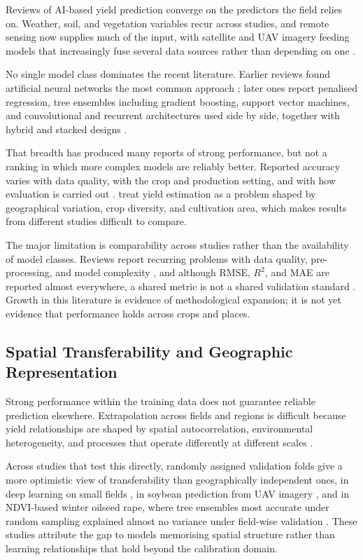 \documentclass[ASNA,twocolumn]{USG}
\begin{document}
Reviews of AI-based yield prediction converge on the predictors the field relies on. Weather,
soil, and vegetation variables recur across studies, and remote sensing now supplies much of
the input, with satellite and UAV imagery feeding models that increasingly fuse several data
sources rather than depending on one \cite{vanKlompenburg2020,Joshi2023,Muruganantham2022,Shawon2025}.

No single model class dominates the recent literature. Earlier reviews found artificial neural
networks the most common approach \cite{vanKlompenburg2020}; later ones report
penalised regression, tree ensembles including gradient boosting, support vector machines,
and convolutional and recurrent architectures used side by side, together with hybrid and
stacked designs \cite{Jabed2024,Screpnik2025,Shawon2025,Sharma2023}.

That breadth has produced many reports of strong performance, but not a ranking in which
more complex models are reliably better. Reported accuracy varies with data quality, with
the crop and production setting, and with how evaluation is carried out
\cite{Screpnik2025,Shawon2025}. \citet{Jabed2024} treat yield estimation as a
problem shaped by geographical variation, crop diversity, and cultivation area, which makes
results from different studies difficult to compare.

The major limitation is comparability across studies rather than the availability of
model classes. Reviews report
recurring problems with data quality, pre-processing, and model complexity
\cite{Jabed2024,Screpnik2025}, and although RMSE, $R^2$, and MAE are reported almost
everywhere, a shared metric is not a shared validation standard
\cite{Screpnik2025,Shawon2025}. Growth in this literature is evidence of methodological
expansion; it is not yet evidence that performance holds across crops and places.

\subsection{Spatial Transferability and Geographic Representation}

Strong performance within the training data does not guarantee reliable prediction
elsewhere. Extrapolation across fields and regions is difficult because yield relationships
are shaped by spatial autocorrelation, environmental heterogeneity, and processes that
operate differently at different scales \cite{Habibi2024,Stiller2024}.

Across studies that test this directly, randomly assigned validation folds give a more
optimistic view of transferability than geographically independent ones, in deep learning on
small fields \cite{Stiller2024}, in soybean prediction from UAV imagery
\cite{Habibi2024}, and in NDVI-based winter oilseed rape, where tree ensembles most
accurate under random sampling explained almost no variance under field-wise validation
\cite{Okupska2026}. These studies attribute the gap to models memorising spatial structure rather than learning
relationships that hold beyond the calibration domain.
\end{document}
